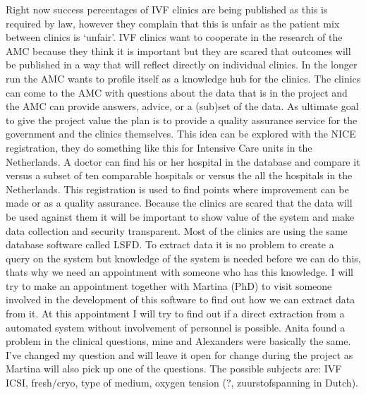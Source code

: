 

Right now success percentages of IVF clinics are being published as this is required by law, however they complain that this is unfair as the patient mix between clinics is ‘unfair’. 
IVF clinics want to cooperate in the research of the AMC because they think it is important but they are scared that outcomes will be published in a way that will reflect directly on individual clinics.
In the longer run the AMC wants to profile itself as a knowledge hub for the clinics. The clinics can come to the AMC with questions about the data that is in the project and the AMC can provide answers, advice, or a (sub)set of the data.
As ultimate goal to give the project value the plan is to provide a quality assurance service for the government and the clinics themselves.
This idea can be explored with the NICE registration, they do something like this for Intensive Care units in the Netherlands. 
A doctor can find his or her hospital in the database and compare it versus a subset of ten comparable hospitals or versus the all the hospitals in the Netherlands. 
This registration is used to find points where improvement can be made or as a quality assurance.
Because the clinics are scared that the data will be used against them it will be important to show value of the system and make data collection and security transparent.
Most of the clinics are using the same database software called LSFD. 
To extract data it is no problem to create a query on the system but knowledge of the system is needed before we can do this, thats why we need an appointment with someone who has this knowledge. 
I will try to make an appointment together with Martina (PhD) to visit someone involved in the development of this software to find out how we can extract data from it. 
At this appointment I will try to find out if a direct extraction from a automated system without involvement of personnel is possible.
Anita found a problem in the clinical questions, mine and Alexanders were basically the same. 
I’ve changed my question and will leave it open for change during the project as Martina will also pick up one of the questions. 
The possible subjects are: IVF ICSI, fresh/cryo, type of medium, oxygen tension (?, zuurstofspanning in Dutch).